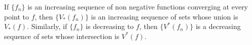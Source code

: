 If $\{f_n\}$ is an increasing sequence of non negative functions converging at every point to $f$, then $\{V_*(f_n)\}$ is an increasing sequence of sets whose union is $V_*(f)$. Similarly, if $\{f_n\}$ is decreasing to $f$, then $\{V^*(f_n)\}$ is a decreasing sequence of sets whose intersection is $V^*(f)$.
